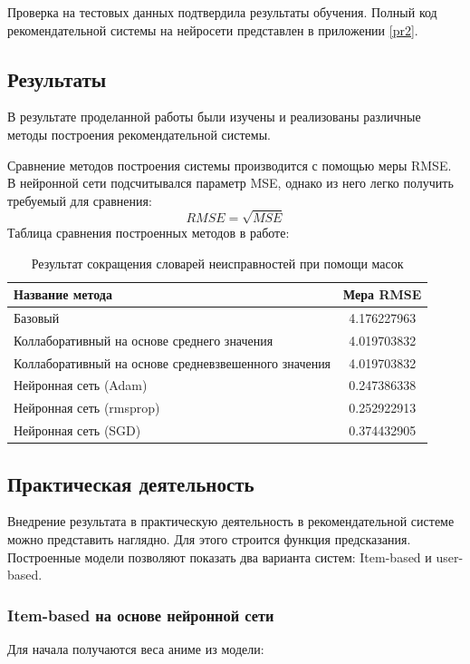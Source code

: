 \documentclass[bachelor, och, diploma]{SCWorks}
\begin{document}
Проверка на тестовых данных подтвердила результаты обучения.
Полный код рекомендательной системы на нейросети представлен в приложении \ref{pr2}.

\subsection{Результаты}
В результате проделанной работы были изучены и реализованы различные методы построения рекомендательной системы. 

Сравнение методов построения системы производится с помощью меры RMSE. В нейронной сети подсчитывался параметр MSE, однако из него легко получить требуемый для сравнения:
$$RMSE = \sqrt{MSE}$$
Таблица сравнения построенных методов в работе:

\begin{table}[!ht]
	\small
	\caption{Результат сокращения словарей неисправностей при помощи масок} \label{table-1}
	\begin{tabular}{|l|c|}
		\hline Название метода & Мера RMSE\\
		\hline Базовый & 4.176227963 \\
		\hline Коллаборативный на основе среднего значения & 4.019703832 \\
		\hline Коллаборативный на основе средневзвешенного значения & 4.019703832 \\
		\hline Нейронная сеть (Adam) & 0.247386338 \\
		\hline Нейронная сеть (rmsprop) & 0.252922913 \\
		\hline Нейронная сеть (SGD) & 0.374432905 \\
		
		\hline
	\end{tabular}
\end{table}

\subsection{Практическая деятельность}
Внедрение результата в практическую деятельность в рекомендательной системе можно представить наглядно. Для этого строится функция предсказания. Построенные модели позволяют показать два варианта систем: Item-based и user-based.

\subsubsection{Item-based на основе нейронной сети}
Для начала получаются веса аниме из модели:
\end{document}
